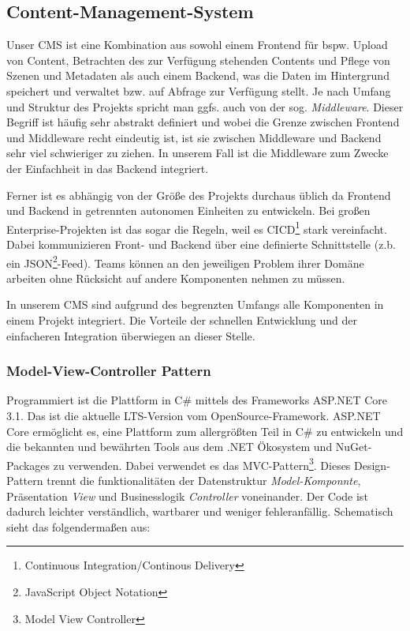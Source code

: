 \documentclass[titlepage, a4paper, 11pt]{scrartcl}
\begin{document}
    \subsection{Content-Management-System}

      Unser CMS ist eine Kombination aus sowohl einem Frontend für bspw. Upload von Content, Betrachten des zur Verfügung stehenden Contents und Pflege von Szenen und Metadaten 
      als auch einem Backend, was die Daten im Hintergrund speichert und verwaltet bzw. auf Abfrage zur Verfügung stellt. Je nach Umfang und Struktur des Projekts spricht man ggfs. auch 
      von der sog. \textit{Middleware}. Dieser Begriff ist häufig sehr abstrakt definiert und wobei die Grenze zwischen Frontend und Middleware recht eindeutig ist,
      ist sie zwischen Middleware und Backend sehr viel schwieriger zu ziehen. In unserem Fall ist die Middleware zum Zwecke der Einfachheit in das Backend integriert.

      Ferner ist es abhängig von der Größe des Projekts durchaus üblich da Frontend und Backend in getrennten autonomen Einheiten zu entwickeln. 
      Bei großen Enterprise-Projekten ist das sogar die Regeln, weil es CICD\footnote{Continuous Integration/Continous Delivery} stark vereinfacht.
      Dabei kommunizieren Front- und Backend über eine definierte Schnittstelle (z.b. ein JSON\footnote{JavaScript Object Notation}-Feed).
      Teams können an den jeweiligen Problem ihrer Domäne arbeiten ohne Rücksicht auf andere Komponenten nehmen zu müssen.

      In unserem CMS sind aufgrund des begrenzten Umfangs alle Komponenten in einem Projekt integriert. 
      Die Vorteile der schnellen Entwicklung und der einfacheren Integration überwiegen an dieser Stelle.

      \subsubsection{Model-View-Controller Pattern}

        Programmiert ist die Plattform in C\# mittels des Frameworks ASP.NET Core 3.1. Das ist die aktuelle LTS-Version vom OpenSource-Framework.
        ASP.NET Core ermöglicht es, eine Plattform zum allergrößten Teil in C\# zu entwickeln und die bekannten und bewährten Tools aus dem .NET Ökosystem und NuGet-Packages zu verwenden.
        Dabei verwendet es das MVC-Pattern\footnote{Model View Controller}. Dieses Design-Pattern trennt die funktionalitäten der Datenstruktur \textit{Model-Komponnte}, Präsentation \textit{View}
        und Businesslogik \textit{Controller} voneinander. Der Code ist dadurch leichter verständlich, wartbarer und weniger fehleranfällig. Schematisch sieht das folgendermaßen aus:
\end{document}
